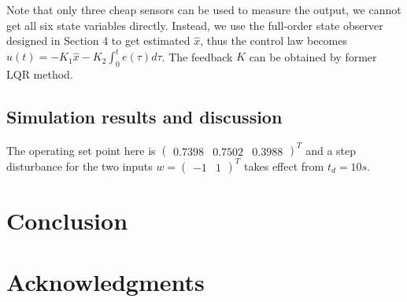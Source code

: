 \documentclass[hyperref]{article}
\theoremstyle{nonumberplain}
\begin{document}
	Note that only three cheap sensors can be used to measure the output, we cannot get all six state variables directly. Instead, we use the full-order state observer designed in Section 4 to get estimated $\hat{x}$, thus the control law becomes $u(t)=-K_{1}\hat{x}-K_{2}\int_{0}^{t}e(\tau )d\tau$. The feedback $K$ can be obtained by former LQR method.
	
	
	\subsection{Simulation results and discussion}
	
	\hspace{1.0em}
	The operating set point here is $\begin{pmatrix}
	0.7398 &0.7502  &0.3988 
	\end{pmatrix}^{T}$ and a step disturbance for the two inputs $w=\begin{pmatrix}
	-1 &1 
	\end{pmatrix}^{T}$ takes effect from $t_{d}=10s$.
	
	
	
	
	
	
	
	
	
	
	
	
	
	\section{Conclusion}
	\section*{Acknowledgments}
	
	
	
	{}
	
\end{document}
